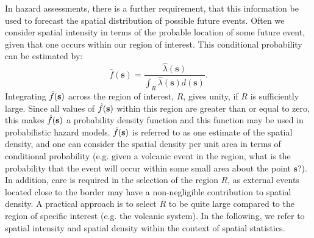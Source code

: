 \documentclass[10pt]{article}
\begin{document}
In hazard assessments, there is a further requirement, that this information be used to forecast the spatial distribution of possible future events. Often we consider spatial intensity in terms of the probable location of some future event, given that one occurs within our region of interest. This conditional probability can be estimated by:
\begin{equation}
\hat f (\mathbf{s}) = \frac{\hat\lambda(\mathbf{s})}{\int_R \hat\lambda(\mathbf{s})d(\mathbf{s})}.
\label{eq14-2}
\end{equation}
Integrating $\hat f(\bf{s})$ across the region of interest, $R$, gives unity, if $R$ is sufficiently large. Since all values of $\hat f(\bf{s})$ within this region are greater than or equal to zero, this makes $\hat f(\bf{s})$ a probability density function and this function may be used in probabilistic hazard models. $\hat f(\bf{s})$ is referred to as one estimate of the spatial density, and one can consider the spatial density per unit area in terms of conditional probability (e.g. given a volcanic event in the region, what is the probability that the event will occur within some small area about the point $\mathbf{s}$?). In addition, care is required in the selection of the region $R$, as external events located close to the border may have a non-negligible contribution to spatial density. A practical approach is to select $R$ to be quite large compared to the region of specific interest (e.g. the volcanic system). In the following, we refer to spatial intensity and spatial density within the context of spatial statistics.
\end{document}

